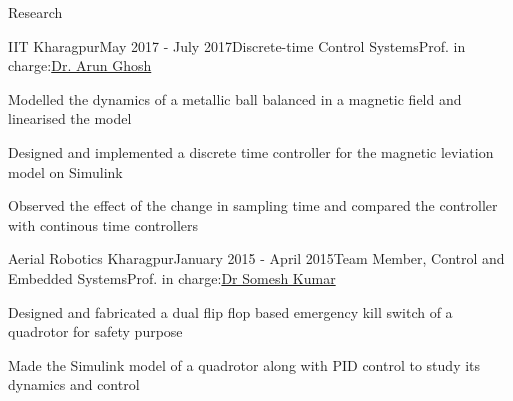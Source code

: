 \documentclass{resume} %
\begin{document}
\begin{rSection}{Research}

\begin{rSubsection}{IIT Kharagpur}{May 2017 - July 2017}{Discrete-time Control Systems}{Prof. in charge:\href{http://www.iitkgp.ac.in/department/EE/faculty/ee-arun}{Dr. Arun Ghosh}}
\item Modelled the dynamics of a metallic ball balanced in a magnetic field and linearised the model
\item Designed and implemented a discrete time controller for the magnetic leviation model on Simulink
\item Observed the effect of the change in sampling time and compared the controller with continous time controllers
\end{rSubsection}



\begin{rSubsection}{Aerial Robotics Kharagpur}{January 2015 - April 2015}{Team Member, Control and Embedded Systems}{Prof. in charge:\href{http://www.facweb.iitkgp.ernet.in/~smsh/} {Dr Somesh Kumar}}
\item Designed and fabricated a dual flip flop based emergency kill switch of a quadrotor for safety purpose
\item Made the Simulink model of a quadrotor along with PID control to study its dynamics and control
\end{rSubsection}

\end{rSection}






\end{document}
